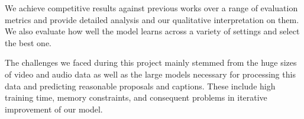 \par We achieve competitive results against previous works over a range of evaluation metrics and provide detailed analysis and our qualitative interpretation on them. We also evaluate how well the model learns across a variety of settings and select the best one.

\par The challenges we faced during this project mainly stemmed from the huge sizes of video and audio data as well as the large models necessary for processing this data and predicting reasonable proposals and captions. These include high training time, memory constraints, and consequent problems in iterative improvement of our model. 	
